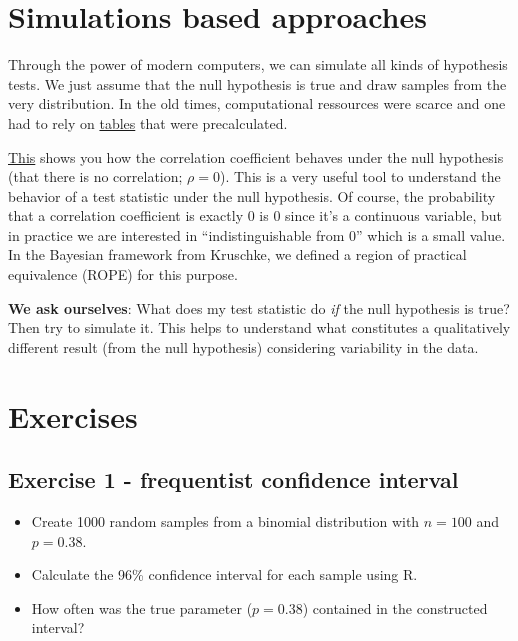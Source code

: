 \documentclass[
]{book}
\providecommand{\tightlist}{%
  \setlength{\itemsep}{0pt}\setlength{\parskip}{0pt}}
\begin{document}
\section{Simulations based approaches}\label{simulations-based-approaches}

Through the power of modern computers, we can simulate all kinds of hypothesis tests.
We just assume that the null hypothesis is true and draw samples from the very distribution.
In the old times, computational ressources were scarce and one had to rely on
\href{https://digital.library.adelaide.edu.au/server/api/core/bitstreams/21f22d02-4a39-4650-8f09-71434ad02897/content}{tables}
that were precalculated.

\href{https://github.com/jdegenfellner/ZHAW_Teaching/blob/main/Variability_of_Correlation_under_H_0.R}{This}
shows you how the correlation coefficient behaves under the null hypothesis (that there is no correlation; \(\rho = 0\)).
This is a very useful tool to understand the behavior of a test statistic under the null hypothesis.
Of course, the probability that a correlation coefficient is exactly 0 is 0 since it's a continuous variable,
but in practice we are interested in ``indistinguishable from 0'' which is a small value.
In the Bayesian framework from Kruschke, we defined a region of practical equivalence (ROPE) for this purpose.

\textbf{We ask ourselves}: What does my test statistic do \emph{if} the null hypothesis is true?
Then try to simulate it. This helps to understand what constitutes a qualitatively different result
(from the null hypothesis) considering variability in the data.

\section{Exercises}\label{exercises-3}

\subsection{Exercise 1 - frequentist confidence interval}\label{exercise1_nhst}

\begin{itemize}
\tightlist
\item
  Create 1000 random samples from a binomial distribution with \(n = 100\) and \(p = 0.38\).
\item
  Calculate the 96\% confidence interval for each sample using R.
\item
  How often was the true parameter (\(p = 0.38\)) contained in the constructed interval?
\end{itemize}
\end{document}
